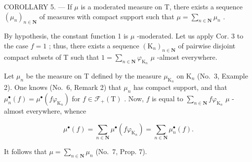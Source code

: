 COROLLARY 5. --- If \(\mu\) is a moderated measure on T, there exists a sequence \((\mu_n)_{n \in \mathbf{N}}\) of measures with compact support such that \(\mu = \sum_{n \in \mathbf{N}} \mu_n\) .

By hypothesis, the constant function 1 is \(\mu\) -moderated. Let us apply Cor. 3 to the case \(f = 1\) ; thus, there exists a sequence \((\mathrm{K}_n)_{n \in \mathbf{N}}\) of pairwise disjoint compact subsets of T such that \(1 = \sum_{n \in \mathbf{N}} \varphi_{\mathrm{K}_n}\) \(\mu\) -almost everywhere.

Let \(\mu_{n}\) be the measure on T defined by the measure \(\mu_{\mathrm{K}_n}\) on \(\mathrm{K}_n\) (No.~3, Example 2). One knows (No.~6, Remark 2) that \(\mu_{n}\) has compact support, and that \(\mu_n^\bullet (f) = \mu^\bullet (f\varphi_{\mathrm{K}_n})\) for \(f\in \mathcal{F}_{+}(\mathrm{T})\) . Now, \(f\) is equal to \(\sum_{n\in \mathbf{N}}f\varphi_{\mathrm{K}_n}\) \(\mu\) -almost everywhere, whence

\[
\mu^ {\bullet} (f) = \sum_ {n \in \mathbf {N}} \mu^ {\bullet} (f \varphi_ {\mathrm{K} _ {n}}) = \sum_ {n \in \mathbf {N}} \mu_ {n} ^ {\bullet} (f).
\]

It follows that \(\mu = \sum_{n\in \mathbf{N}}\mu_n\) (No.~7, Prop. 7).

